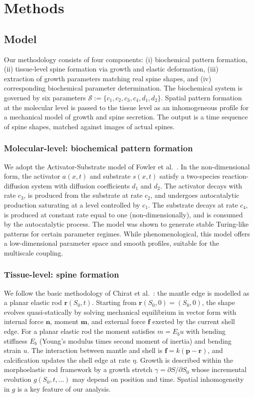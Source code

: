 \documentclass[11pt]{article}
\begin{document}
\section{Methods}
\subsection{Model}
Our methodology consists of four components: (i) biochemical pattern formation, (ii) tissue-level spine formation via growth and elastic deformation, (iii) extraction of growth parameters matching real spine shapes, and (iv) corresponding biochemical parameter determination. The biochemical system is governed by six parameters $\mathcal{S}:=\{c_1,c_2,c_3,c_4,d_1,d_2\}$. Spatial pattern formation at the molecular level is passed to the tissue level as an inhomogeneous profile for a mechanical model of growth and spine secretion. The output is a time sequence of spine shapes, matched against images of actual spines.

\subsubsection{Molecular-level: biochemical pattern formation}
We adopt the Activator-Substrate model of Fowler et al.\ \citep{ref26}. In the non-dimensional form, the activator $a(x,t)$ and substrate $s(x,t)$ satisfy a two-species reaction-diffusion system with diffusion coefficients $d_1$ and $d_2$. The activator decays with rate $c_3$, is produced from the substrate at rate $c_2$, and undergoes autocatalytic production saturating at a level controlled by $c_1$. The substrate decays at rate $c_4$, is produced at constant rate equal to one (non-dimensionally), and is consumed by the autocatalytic process. The model was shown \citep{ref26} to generate stable Turing-like patterns for certain parameter regimes. While phenomenological, this model offers a low-dimensional parameter space and smooth profiles, suitable for the multiscale coupling.

\subsubsection{Tissue-level: spine formation}
We follow the basic methodology of Chirat et al.\ \citep{ref19}: the mantle edge is modelled as a planar elastic rod $\mathbf{r}(S_0,t)$. Starting from $\mathbf{r}(S_0,0)=(S_0,0)$, the shape evolves quasi-statically by solving mechanical equilibrium in vector form with internal force $\mathbf{n}$, moment $\mathbf{m}$, and external force $\mathbf{f}$ exerted by the current shell edge. For a planar elastic rod the moment satisfies $m=E_b u$ with bending stiffness $E_b$ (Young's modulus times second moment of inertia) and bending strain $u$. The interaction between mantle and shell is $\mathbf{f}=k(\mathbf{p}-\mathbf{r})$, and calcification updates the shell edge at rate $\eta$. Growth is described within the morphoelastic rod framework \citep{ref36} by a growth stretch $\gamma=\partial S/\partial S_0$ whose incremental evolution $g(S_0,t,\ldots)$ may depend on position and time. Spatial inhomogeneity in $g$ is a key feature of our analysis.
\end{document}
